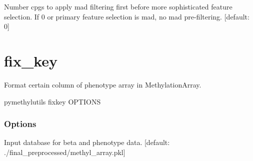\documentclass[letterpaper,10pt,english]{sphinxmanual}
\begin{document}
\begin{fulllineitems}
\label{\detokenize{index:cmdoption-pymethyl-utils-feature-select-train-val-test-m}}
Number cpgs to apply mad filtering first before more sophisticated feature selection. If 0 or primary feature selection is mad, no mad pre-filtering.  {[}default: 0{]}

\end{fulllineitems}



\section{fix\_key}
\label{\detokenize{index:pymethyl-utils-fix-key}}
Format certain column of phenotype array in MethylationArray.

\begin{sphinxVerbatim}[commandchars=\\\{\}]
pymethyl\PYGZhy{}utils fix\PYGZus{}key \PYG{o}{[}OPTIONS\PYG{o}{]}
\end{sphinxVerbatim}
\subsubsection*{Options}

\begin{fulllineitems}
\label{\detokenize{index:cmdoption-pymethyl-utils-fix-key-i}}
Input database for beta and phenotype data.  {[}default: ./final\_preprocessed/methyl\_array.pkl{]}

\end{fulllineitems}

\end{document}
